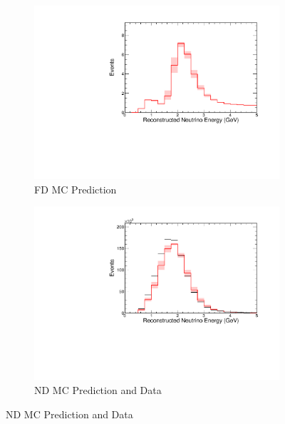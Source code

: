 {\begin{figure}
\end{figure}



\begin{figure}
\begin{center}
\begin{subfigure}[c]{0.49\textwidth}
\includegraphics[width=\textwidth]{figures/systs/prediction/fd_mc_prediction_hadERel.pdf}
\caption*{FD MC Prediction}
\end{subfigure}
\begin{subfigure}[c]{0.49\textwidth}
\includegraphics[width=\textwidth]{figures/systs/prediction/nd_mc_prediction_hadERel.pdf}
\caption*{ND MC Prediction and Data}
\end{subfigure}

\vspace{20pt}


\end{center}
\end{figure}}
